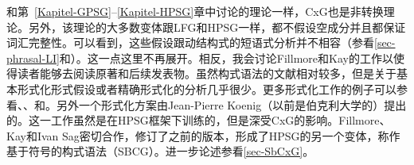 和第~\ref{Kapitel-GPSG}--\ref{Kapitel-HPSG}章中讨论的理论一样，CxG也是非转换理论。另外，该理论的大多数变体跟LFG和HPSG一样，都不假设空成分并且都保证词汇完整性。可以看到，这些假设跟动结构式的短语式分析并不相容（参看\ref{sec-phrasal-LI}和\citealp{Mueller2006d,Mueller2007d}）。这一点这里不再展开。相反，我会讨论Fillmore和Kay的工作以使得读者能够去阅读原著和后续发表物。虽然构式语法的文献相对较多，但是关于基本形式化形式假设或者精确形式化的分析几乎很少。更多形式化工作的例子可以参看、\citet{Kay2002a}、和。另外一个形式化方案由Jean-Pierre Koenig\citeyearpar{Koenig99a}（以前是伯克利大学的）提出的。这一工作虽然是在HPSG框架下训练的，但是深受CxG的影响。Fillmore、Kay和Ivan Sag密切合作，修订了之前的版本，形成了HPSG的另一个变体，称作基于符号的构式语法（SBCG）\citep{Sag2010b,Sag2012a}。进一步论述参看\ref{sec-SbCxG}。

